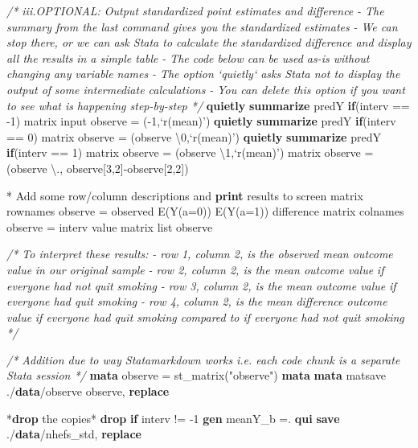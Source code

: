 \documentclass[
  10pt,
]{book}
\newenvironment{Shaded}{\begin{snugshade}}{\end{snugshade}}
\newcommand{\CommentTok}[1]{\textcolor[rgb]{0.56,0.35,0.01}{\textit{#1}}}
\newcommand{\FunctionTok}[1]{\textcolor[rgb]{0.00,0.00,0.00}{#1}}
\newcommand{\KeywordTok}[1]{\textcolor[rgb]{0.13,0.29,0.53}{\textbf{#1}}}
\newcommand{\NormalTok}[1]{#1}
\newcommand{\OtherTok}[1]{\textcolor[rgb]{0.56,0.35,0.01}{#1}}
\newcommand{\StringTok}[1]{\textcolor[rgb]{0.31,0.60,0.02}{#1}}
\begin{document}
\begin{Shaded}
\begin{Highlighting}[]
\CommentTok{/* iii.OPTIONAL: Output standardized point estimates and difference}
\CommentTok{- The summary from the last command gives you the }
\CommentTok{standardized estimates}
\CommentTok{- We can stop there, or we can ask Stata to calculate the }
\CommentTok{standardized difference and display all the results }
\CommentTok{in a simple table}
\CommentTok{- The code below can be used as-is without changing any}
\CommentTok{variable names}
\CommentTok{- The option `quietly` asks Stata not to display the output of }
\CommentTok{some intermediate calculations}
\CommentTok{- You can delete this option if you want to see what is }
\CommentTok{happening step-by-step */}
\KeywordTok{quietly} \KeywordTok{summarize}\NormalTok{ predY }\KeywordTok{if}\NormalTok{(interv == -1)}
\FunctionTok{matrix}\NormalTok{ input observe = (-1,}\OtherTok{`r(mean)'}\NormalTok{)}
\KeywordTok{quietly} \KeywordTok{summarize}\NormalTok{ predY }\KeywordTok{if}\NormalTok{(interv == 0)}
\FunctionTok{matrix}\NormalTok{ observe = (observe \textbackslash{}0,}\OtherTok{`r(mean)'}\NormalTok{)}
\KeywordTok{quietly} \KeywordTok{summarize}\NormalTok{ predY }\KeywordTok{if}\NormalTok{(interv == 1)}
\FunctionTok{matrix}\NormalTok{ observe = (observe \textbackslash{}1,}\OtherTok{`r(mean)'}\NormalTok{)}
\FunctionTok{matrix}\NormalTok{ observe = (observe \textbackslash{}., observe[3,2]-observe[2,2]) }

\NormalTok{* Add some }\OtherTok{row}\NormalTok{/column descriptions and }\KeywordTok{print}\NormalTok{ results to screen}
\FunctionTok{matrix} \OtherTok{rownames}\NormalTok{ observe = observed E(Y(a=0)) E(Y(a=1)) difference}
\FunctionTok{matrix} \OtherTok{colnames}\NormalTok{ observe = interv }\OtherTok{value}
\FunctionTok{matrix} \OtherTok{list}\NormalTok{ observe }

\CommentTok{/* To interpret these results:}
\CommentTok{- row 1, column 2, is the observed mean outcome value }
\CommentTok{in our original sample}
\CommentTok{- row 2, column 2, is the mean outcome value }
\CommentTok{if everyone had not quit smoking}
\CommentTok{- row 3, column 2, is the mean outcome value }
\CommentTok{if everyone had quit smoking}
\CommentTok{- row 4, column 2, is the mean difference outcome value }
\CommentTok{if everyone had quit smoking compared to if everyone }
\CommentTok{had not quit smoking */}

\CommentTok{/* Addition due to way Statamarkdown works }
\CommentTok{i.e. each code chunk is a separate Stata session */}
\KeywordTok{mata}\NormalTok{ observe = st_matrix(}\StringTok{"observe"}\NormalTok{)}
\KeywordTok{mata} \KeywordTok{mata}\NormalTok{ matsave ./}\KeywordTok{data}\NormalTok{/observe observe, }\KeywordTok{replace}

\NormalTok{*}\KeywordTok{drop}\NormalTok{ the copies*}
\KeywordTok{drop} \KeywordTok{if}\NormalTok{ interv != -1}
\KeywordTok{gen}\NormalTok{ meanY_b =.}
\KeywordTok{qui} \KeywordTok{save}\NormalTok{ ./}\KeywordTok{data}\NormalTok{/nhefs_std, }\KeywordTok{replace}
\end{Highlighting}
\end{Shaded}
\end{document}
